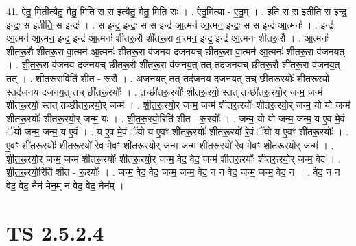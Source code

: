 \documentclass[17pt]{extarticle}
\begin{document}
41. ऐतु॒ मितीत्यैतु॒ मैतु॒ मिति॒ स स इत्यैतु॒ मैतु॒ मिति॒ सः । . ऐतु॒मित्या - ए॒तु॒म् । . इति॒ स स इतीति॒ स इन्द्र॒ इन्द्रः॒ स इतीति॒ स इन्द्रः॑ । . स इन्द्र॒ इन्द्रः॒ स स इन्द्र॑ आ॒त्मन॑ आ॒त्मन॒ इन्द्रः॒ स स इन्द्र॑ आ॒त्मनः॑ । . इन्द्र॑ आ॒त्मन॑ आ॒त्मन॒ इन्द्र॒ इन्द्र॑ आ॒त्मनः॑ शीतरू॒रौ शी॑तरू॒रा वा॒त्मन॒ इन्द्र॒ इन्द्र॑ आ॒त्मनः॑ शीतरू॒रौ । . आ॒त्मनः॑ शीतरू॒रौ शी॑तरू॒रा वा॒त्मन॑ आ॒त्मनः॑ शीतरू॒रा व॑जनय दजनयच् छीतरू॒रा वा॒त्मन॑ आ॒त्मनः॑ शीतरू॒रा व॑जनयत् । . शी॒त॒रू॒रा व॑जनय दजनयच् छीतरू॒रौ शी॑तरू॒रा व॑जनय॒त् तत् तद॑जनयच् छीतरू॒रौ शी॑तरू॒रा व॑जनय॒त् तत् । . शी॒त॒रू॒राविति॑ शीत - रू॒रौ । . अ॒ज॒न॒य॒त् तत् तद॑जनय दजनय॒त् तच् छी॑तरू॒रयोः᳚ शीतरू॒रयो॒ स्तद॑जनय दजनय॒त् तच् छी॑तरू॒रयोः᳚ । . तच्छी॑तरू॒रयोः᳚ शीतरू॒रयो॒ स्तत् तच्छी॑तरू॒रयो॒र् जन्म॒ जन्म॑ शीतरू॒रयो॒ स्तत् तच्छी॑तरू॒रयो॒र् जन्म॑ । . शी॒त॒रू॒रयो॒र् जन्म॒ जन्म॑ शीतरू॒रयोः᳚ शीतरू॒रयो॒र् जन्म॒ यो यो जन्म॑ शीतरू॒रयोः᳚ शीतरू॒रयो॒र् जन्म॒ यः । . शी॒त॒रू॒रयो॒रिति॑ शीत - रू॒रयोः᳚ । . जन्म॒ यो यो जन्म॒ जन्म॒ य ए॒व मे॒वं ॅयो जन्म॒ जन्म॒ य ए॒वं । . य ए॒व मे॒वं ॅयो य ए॒वꣳ शी॑तरू॒रयोः᳚ शीतरू॒रयो॑ रे॒वं ॅयो य ए॒वꣳ शी॑तरू॒रयोः᳚ । . ए॒वꣳ शी॑तरू॒रयोः᳚ शीतरू॒रयो॑ रे॒व मे॒वꣳ शी॑तरू॒रयो॒र् जन्म॒ जन्म॑ शीतरू॒रयो॑ रे॒व मे॒वꣳ शी॑तरू॒रयो॒र् जन्म॑ । . शी॒त॒रू॒रयो॒र् जन्म॒ जन्म॑ शीतरू॒रयोः᳚ शीतरू॒रयो॒र् जन्म॒ वेद॒ वेद॒ जन्म॑ शीतरू॒रयोः᳚ शीतरू॒रयो॒र् जन्म॒ वेद॑ । . शी॒त॒रू॒रयो॒रिति॑ शीत - रू॒रयोः᳚ । . जन्म॒ वेद॒ वेद॒ जन्म॒ जन्म॒ वेद॒ न न वेद॒ जन्म॒ जन्म॒ वेद॒ न । . वेद॒ न न वेद॒ वेद॒ नैन॑ मेन॒म् न वेद॒ वेद॒ नैन᳚म् । \newline
\pagebreak
{}
\section*{ TS 2.5.2.4 }
\end{document}
